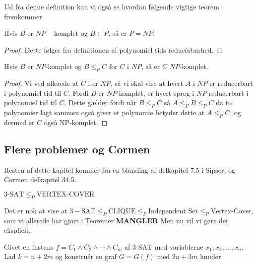 Ud fra denne definition kan vi også se hvordan følgende vigtige teorem fremkommer.
\begin{theorem}
	Hvis $B$ er $NP-$komplet og $B \in P$, så er $P = NP$.
\end{theorem}

\begin{proof}
	Dette følger fra definitionen af polynomiel tids reducérbarhed.
\end{proof}

\begin{theorem}
	Hvis $B$ er $NP$-komplet og $B \le_{P} C$ for $C$ i $NP$, så er $C$ $NP$-komplet.
\end{theorem}

\begin{proof}
	Vi ved allerede at $C$ i er $NP$, så vi skal vise at hvert $A$ i $NP$ er reducerbart i polynomiel tid til $C$. Fordi $B$ er $NP$-komplet, er hvert sprog i $NP$ reducerbart i polynomiel tid til $C$. Dette gælder fordi når $B \le_{P} C$ så $A \le_{P} B \le_{P} C$ da to polynomier lagt sammen også giver et polynomie betyder dette at $A \leq_{P} C$, og dermed er $C$ også NP-komplet.
\end{proof}

\subsection{Flere problemer og Cormen}%
\label{subsec:7.5andcormen}

Resten af dette kapitel kommer fra en blanding af delkapitel 7.5 i Sipser, og Cormen delkapitel 34.5.

\begin{theorem}
	$3 \text{-SAT} \le_P \text{VERTEX-COVER}$
\end{theorem}

Det er nok at vise at $3-\text{SAT} \le_{P} \text{CLIQUE} \le_{P} \text{Independent Set} \le_{P} \text{Vertex-Cover}$, som vi allerede har gjort i Teoremer \textbf{MANGLER} %
Men nu vil vi gøre det eksplicit.

Givet en instans $f = C_{1} \land C_{2} \land \cdots \land C_{m}$  af 3$\text{-SAT}$ med variablerne $x_{1}, x_{2}, \ldots, x_{n}$. Lad $k = n + 2m$ og konstruér en graf $G = G(f)$ med $2n+3m$ knuder.









